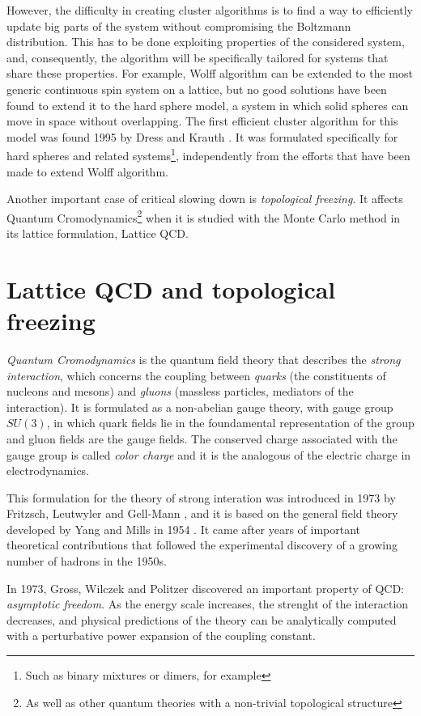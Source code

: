 However, the difficulty in creating cluster algorithms is to find a way to efficiently update big parts of the system without compromising the Boltzmann distribution.
This has to be done exploiting properties of the considered system, and, consequently, the algorithm will be specifically tailored for systems that share these properties.
For example, Wolff algorithm can be extended to the most generic continuous spin system on a lattice,
but no good solutions have been found to extend it to the hard sphere model,
\ie a system in which solid spheres can move in space without overlapping.
The first efficient cluster algorithm for this model was found 1995 by Dress and Krauth \cite{dress-krauth:1995}.
It was formulated specifically for hard spheres and related systems\footnote{Such as binary mixtures or dimers, for example},
independently from the efforts that have been made to extend Wolff algorithm.

Another important case of critical slowing down is \emph{topological freezing}.
It affects Quantum Cromodynamics\footnote{As well as other quantum theories with a non-trivial topological structure}
when it is studied with the Monte Carlo method in its lattice formulation, \ie Lattice QCD.

\section*{Lattice QCD and topological freezing}
\emph{Quantum Cromodynamics} is the quantum field theory that describes the \emph{strong interaction},
which concerns the coupling between \emph{quarks} (the constituents of nucleons and mesons) and \emph{gluons} (massless particles, mediators of the interaction).
It is formulated as a non-abelian gauge theory, with gauge group $SU(3)$,
in which quark fields lie in the foundamental representation of the group and gluon fields are the gauge fields.
The conserved charge associated with the gauge group is called \emph{color charge} and it is the analogous of the electric charge in electrodynamics.

This formulation for the theory of strong interation was introduced in 1973 by Fritzsch, Leutwyler and Gell-Mann \cite{fritzsch:1973},
and it is based on the general field theory developed by Yang and Mills in 1954 \cite{yang-mills:1954}.
It came after years of important theoretical contributions that followed the experimental discovery of a growing number of hadrons in the 1950s.

In 1973, Gross, Wilczek \cite{gross-wilczek:1973} and Politzer \cite{politzer:1973} discovered an important property of QCD: \emph{asymptotic freedom}.
As the energy scale increases, the strenght of the interaction decreases,
and physical predictions of the theory can be analytically computed with a perturbative power expansion of the coupling constant.

